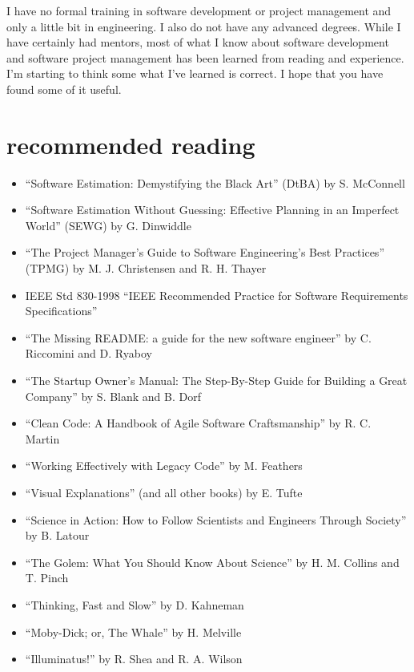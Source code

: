 \documentclass[12pt,oneside]{book}
\begin{document}
I have no formal training in software development or project management and only a little bit in engineering. I also do not have any advanced degrees. While I have certainly had mentors, most of what I know about software development and software project management has been learned from reading and experience. I'm starting to think some what I've learned is correct. I hope that you have found some of it useful.

\newpage
{}
\chapter*{recommended reading}

\begin{itemize}[wide, labelwidth=!, labelindent=0pt]
\item ``Software Estimation: Demystifying the Black Art'' (DtBA) by S. McConnell
\item ``Software Estimation Without Guessing: Effective Planning in an Imperfect World'' (SEWG) by G. Dinwiddle
\item ``The Project Manager's Guide to Software Engineering's Best Practices'' (TPMG) by M. J. Christensen and R. H. Thayer
\item IEEE Std 830-1998 ``IEEE Recommended Practice for Software Requirements Specifications''
\item ``The Missing README: a guide for the new software engineer'' by C. Riccomini and D. Ryaboy
\item ``The Startup Owner's Manual: The Step-By-Step Guide for Building a Great Company'' by S. Blank and B. Dorf
\item ``Clean Code: A Handbook of Agile Software Craftsmanship'' by R. C. Martin 
\item ``Working Effectively with Legacy Code'' by M. Feathers
\item ``Visual Explanations'' (and all other books) by E. Tufte
\item ``Science in Action: How to Follow Scientists and Engineers Through Society'' by B. Latour
\item ``The Golem: What You Should Know About Science'' by H. M. Collins and T. Pinch
\item ``Thinking, Fast and Slow'' by D. Kahneman
\item ``Moby-Dick; or, The Whale'' by H. Melville
\item ``Illuminatus!'' by R. Shea and R. A. Wilson
\end{itemize}
\end{document}
